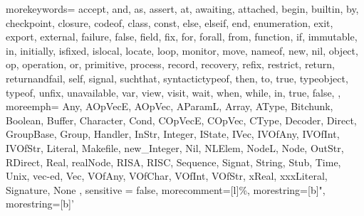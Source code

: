 {
  morekeywords={
    accept, and, as, assert,
    at, awaiting, attached, begin,
    builtin, by, checkpoint, closure,
    codeof, class, const, else,
    elseif, end, enumeration, exit,
    export, external, failure, false,
    field, fix, for, forall,
    from, function, if, immutable,
    in, initially, isfixed, islocal,
    locate, loop, monitor, move,
    nameof, new, nil, object,
    op, operation, or, primitive,
    process, record, recovery, refix,
    restrict, return, returnandfail, self,
    signal, suchthat, syntactictypeof, then,
    to, true, typeobject, typeof,
    unfix, unavailable, var, view,
    visit, wait, when, while,
    in,
    true, false,
  },
  moreemph={
    Any, AOpVecE, AOpVec, AParamL,
    Array, AType, Bitchunk, Boolean,
    Buffer, Character, Cond, COpVecE,
    COpVec, CType, Decoder, Direct,
    GroupBase, Group, Handler, InStr,
    Integer, IState, IVec, IVOfAny,
    IVOfInt, IVOfStr, Literal, Makefile,
    new_Integer, Nil, NLElem, NodeL,
    Node, OutStr, RDirect, Real,
    realNode, RISA, RISC, Sequence,
    Signat, String, Stub, Time,
    Unix, vec-ed, Vec, VOfAny,
    VOfChar, VOfInt, VOfStr, xReal,
    xxxLiteral,
    Signature,
    None
  },
  sensitive = false,
  morecomment=[l]{\%},
  morestring=[b]",
  morestring=[b]'
}
